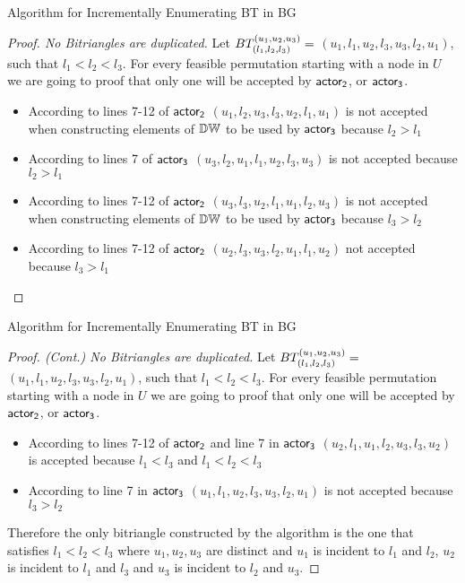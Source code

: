 \begin{frame}[fragile]{Algorithm for Incrementally Enumerating BT in BG}
  \begin{proof}[Proof. No Bitriangles are duplicated]   
  Let $BT_{(l_1, l_2,l_3)}^{(u_1, u_2, u_3)} =$  $(u_1,l_1,u_2,l_3,u_3,l_2,u_1)$, such that $l_1 < l_2 <l_3$. For every feasible permutation  starting with a node in $U$ we are going to proof that only one will be accepted by $\mathsf{actor_2}$, or $\mathsf{actor_3}$.  
  \begin{itemize}
        \item According to lines 7-12 of $\mathsf{actor_2}$ $(u_1,l_2,u_3,l_3,u_2,l_1,u_1)$ is  not accepted  when constructing elements of $\mathbb{DW}$ to be used by $\mathsf{actor_3}$  because $l_2 > l_1$ 
        \item According to lines 7 of $\mathsf{actor_3}$ $(u_3,l_2,u_1,l_1,u_2,l_3,u_3)$ is not accepted because $l_2 > l_1$
        \item According to lines 7-12 of $\mathsf{actor_2}$ $(u_3,l_3,u_2,l_1,u_1,l_2,u_3)$ is  not accepted  when constructing elements of $\mathbb{DW}$ to be used by $\mathsf{actor_3}$  because  $l_3 > l_2$
        \item According to lines 7-12 of $\mathsf{actor_2}$ $(u_2,l_3,u_3,l_2,u_1,l_1,u_2)$ not accepted because $l_3 > l_1 $
  \end{itemize}
  \end{proof}  
\end{frame}

\begin{frame}[fragile]{Algorithm for Incrementally Enumerating BT in BG}
  \begin{proof}[Proof. (Cont.) No Bitriangles are duplicated]   
  Let $BT_{(l_1, l_2,l_3)}^{(u_1, u_2, u_3)} =$  $(u_1,l_1,u_2,l_3,u_3,l_2,u_1)$, such that $l_1 < l_2 <l_3$. For every feasible permutation  starting with a node in $U$ we are going to proof that only one will be accepted by $\mathsf{actor_2}$, or $\mathsf{actor_3}$.  
  \begin{itemize}
        \item According to lines 7-12 of $\mathsf{actor_2}$ and line 7 in $\mathsf{actor_3}$ $(u_2,l_1,u_1,l_2,u_3,l_3,u_2)$ is accepted because $l_1 < l_3 $ and $l_1 < l_2 <l_3$ 
        \item According to  line 7 in $\mathsf{actor_3}$ $(u_1, l_1,u_2,l_3,u_3,l_2,u_1)$ is not accepted because $l_3 > l_2$
  \end{itemize}
  Therefore the  only bitriangle  constructed by the algorithm is the one that satisfies $l_1 < l_2 < l_3$ where $u_1,u_2,u_3$  are distinct and $u_1$ is incident to $l_1$ and $l_2$, $u_2$ is incident to $l_1$ and $l_3$ and $u_3$ is incident to $l_2$ and $u_3$.
  \end{proof}  
\end{frame}


